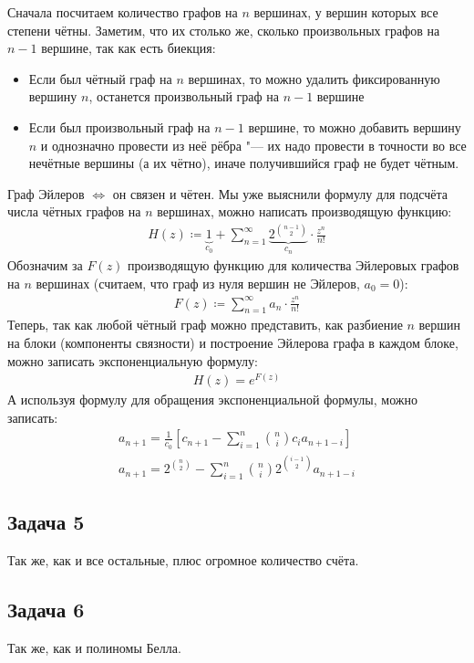 	Сначала посчитаем количество графов на $n$ вершинах, у вершин которых все степени чётны.
	Заметим, что их столько же, сколько произвольных графов на $n-1$ вершине, так как есть биекция:
	\begin{itemize}
		\item
			Если был чётный граф на $n$ вершинах, то можно удалить фиксированную вершину $n$, останется произвольный граф на $n-1$ вершине
		\item
			Если был произвольный граф на $n-1$ вершине, то можно добавить вершину $n$ и однозначно провести из неё рёбра "--- их надо провести в точности
			во все нечётные вершины (а их чётно), иначе получившийся граф не будет чётным.
	\end{itemize}
	Граф Эйлеров $\iff$ он связен и чётен.
	Мы уже выяснили формулу для подсчёта числа чётных графов на $n$ вершинах, можно написать производящую функцию:
	\begin{gather*}
		H(z) \coloneqq \underbrace{1}_{c_0} + \sum_{n=1}^\infty \underbrace{2^{\binom{n-1}{2}}}_{c_n} \cdot \frac{z^n}{n!}
	\end{gather*}
	Обозначим за $F(z)$ производящую функцию для количества Эйлеровых графов на $n$ вершинах (считаем, что граф из нуля вершин не Эйлеров, $a_0=0$):
	\begin{gather*}
		F(z) \coloneqq \sum_{n=1}^\infty a_n \cdot \frac{z^n}{n!}
	\end{gather*}
	Теперь, так как любой чётный граф можно представить, как разбиение $n$ вершин на блоки (компоненты связности) и построение Эйлерова графа в каждом блоке, можно записать экспоненциальную формулу:
	\begin{gather*}
		H(z) = e^{F(z)}
	\end{gather*}
	А используя формулу для обращения экспоненциальной формулы, можно записать:
	\begin{gather*}
		a_{n+1} = \frac{1}{c_0} \left[c_{n+1} - \sum_{i=1}^n \binom{n}{i} c_ia_{n+1-i} \right] \\
		a_{n+1} = 2^{\binom{n}{2}} - \sum_{i=1}^n \binom{n}{i} 2^{\binom{i-1}{2}} a_{n+1-i}
	\end{gather*}

\subsection{Задача 5}
	Так же, как и все остальные, плюс огромное количество счёта.

\subsection{Задача 6}
	Так же, как и полиномы Белла.

